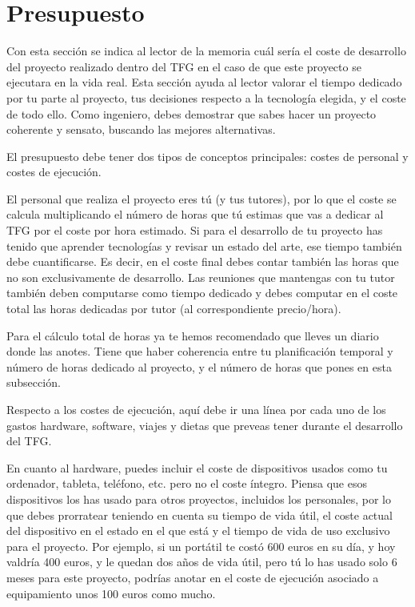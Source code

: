\section{Presupuesto}

Con esta sección se indica al lector de la memoria cuál sería el coste de desarrollo del proyecto realizado dentro del TFG en el caso de que este proyecto se ejecutara en la vida real. Esta sección ayuda al lector valorar el tiempo dedicado por tu parte al proyecto, tus decisiones respecto a la tecnología elegida, y el coste de todo ello. Como ingeniero, debes demostrar que sabes hacer un proyecto coherente  y sensato, buscando las mejores alternativas. 

El presupuesto debe tener dos tipos de conceptos principales: costes de personal y costes de ejecución.

El personal que realiza el proyecto eres tú (y tus tutores), por lo que el coste se calcula multiplicando el número de horas que tú estimas que vas a dedicar al TFG por el coste por hora estimado. Si para el desarrollo de tu proyecto has tenido que aprender tecnologías y revisar un estado del arte, ese tiempo también debe cuantificarse. Es decir, en el coste final debes contar también las horas que no son exclusivamente de desarrollo. Las reuniones que mantengas con tu tutor también deben computarse como tiempo dedicado y debes computar en el coste total las horas dedicadas por tutor (al correspondiente precio/hora).

Para el cálculo total de horas ya te hemos recomendado que lleves un diario donde las anotes. Tiene que haber coherencia entre tu planificación temporal y número de horas dedicado al proyecto, y el número de horas que pones en esta subsección.

Respecto a los costes de ejecución, aquí debe ir una línea por cada uno de los gastos hardware, software, viajes y dietas que preveas tener durante el desarrollo del TFG. 

En cuanto al hardware, puedes incluir el coste de dispositivos usados como tu ordenador, tableta, teléfono, etc. pero no el coste íntegro. Piensa que esos dispositivos los has usado para otros proyectos, incluidos los personales, por lo que debes prorratear teniendo en cuenta su tiempo de vida útil, el coste actual del dispositivo en el estado en el que está y el tiempo de vida de uso exclusivo para el proyecto. Por ejemplo, si un portátil te costó 600 euros en su día, y hoy valdría 400 euros, y le quedan dos años de vida útil, pero tú lo has usado solo 6 meses para este proyecto, podrías anotar en el coste de ejecución asociado a equipamiento unos 100 euros como mucho.  

